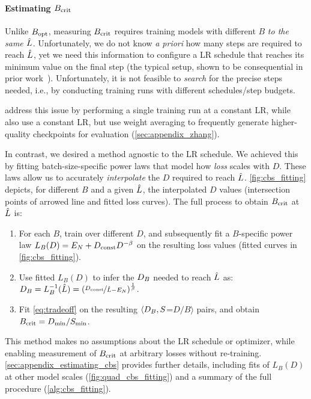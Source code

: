 \paragraph{Estimating $B_{\text{crit}}$}\label{sec:estimating_bcrit}


Unlike $B_{\text{opt}}$, measuring $B_{\text{crit}}$ requires training models with
different $B$ \emph{to the same $\hat{L}$}.
%
Unfortunately, we do not know \emph{a priori} how many steps are
required to reach $\hat{L}$, yet we need this information to configure a
LR schedule that reaches its minimum value on the final step (the
typical setup, shown to be consequential in prior
work~\citep{hoffmann2022empirical,hagele2024scaling}).
%
Unfortunately, it is not feasible to \emph{search} for the precise
steps needed, i.e., by conducting training runs with different
schedules/step budgets.

\citet{mccandlish2018empirical} address this issue by performing
a single training run at a constant LR, while \citet{zhang2024how}
also use a constant LR, but use weight averaging to frequently
generate higher-quality checkpoints for evaluation
(\cref{sec:appendix_zhang}).

In contrast, we desired a method agnostic to the LR schedule.
%
We achieved this by fitting batch-size-specific power laws that model
how \emph{loss} scales with $D$.
%
These laws allow us to accurately \emph{interpolate} the $D$ required
to reach $\hat{L}$.  \cref{fig:cbs_fitting} depicts, for different $B$
and a given $\hat{L}$, the interpolated $D$ values (intersection points
of arrowed line and fitted loss curves).  The full process to obtain
$B_{\text{crit}}$ at $\hat{L}$ is:
\begin{enumerate}
\item For each $B$, train over different $D$, and
subsequently fit a $B$-specific power law \mbox{$L_{B}(D) = E_N + D_{\text{const}} D^{-\beta}$}
on the resulting loss values (fitted curves in \cref{fig:cbs_fitting}).
\item Use fitted $L_{B}(D)$ to infer the $D_B$ needed to reach $\hat{L}$ as:
\mbox{$D_B = L_{B}^{-1}(\hat{L}) = (\nicefrac{D_{\text{const}}}{\hat{L}-E_N})^{\frac{1}{\beta}}$}.
\item Fit \cref{eq:tradeoff} on the resulting $\langle D_B, S$=${D}/{B} \rangle$ pairs, and obtain $B_{\text{crit}} = {D_{\text{min}}}/{S_{\text{min}}}$.
\end{enumerate}
%
This method makes no assumptions about the LR schedule or optimizer,
while enabling measurement of $B_{\text{crit}}$ at arbitrary losses without
re-training.
%
\cref{sec:appendix_estimating_cbs} provides further details,
%
including fits of $L_{B}(D)$ at other model scales
(\cref{fig:quad_cbs_fitting}) and a summary of the full procedure
(\cref{alg:cbs_fitting}).

